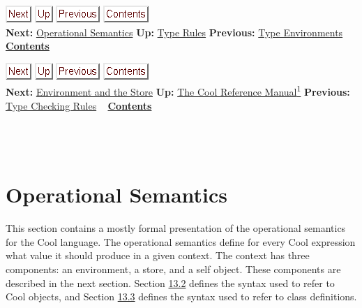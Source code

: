 \documentclass[]{article}
\begin{document}
\href{node44.html}{\includegraphics{next.png}}
\href{node41.html}{\includegraphics{up.png}}
\href{node42.html}{\includegraphics{prev.png}}
\href{node1.html}{\includegraphics{contents.png}} \\ \textbf{Next:}
\href{node44.html}{Operational Semantics} \textbf{Up:}
\href{node41.html}{Type Rules} \textbf{Previous:}
\href{node42.html}{Type Environments} ~
\textbf{\href{node1.html}{Contents}}

\href{node45.html}{\includegraphics{next.png}}
\href{cool-manual.html}{\includegraphics{up.png}}
\href{node43.html}{\includegraphics{prev.png}}
\href{node1.html}{\includegraphics{contents.png}} \\ \textbf{Next:}
\href{node45.html}{Environment and the Store} \textbf{Up:}
\href{cool-manual.html}{The Cool Reference Manual\textsuperscript{1}}
\textbf{Previous:} \href{node43.html}{Type Checking Rules} ~
\textbf{\href{node1.html}{Contents}} \\ \\

\section{\\ Operational Semantics}

This section contains a mostly formal presentation of the operational
semantics for the Cool language. The operational semantics define for
every Cool expression what value it should produce in a given context.
The context has three components: an environment, a store, and a self
object. These components are described in the next section. Section
\href{node46.html\#objectsyntax}{13.2} defines the syntax used to refer
to Cool objects, and Section \href{node47.html\#classdefs}{13.3} defines
the syntax used to refer to class definitions.
\end{document}
